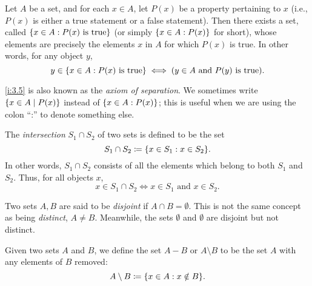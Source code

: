 \begin{ax}\label{i:3.5}
  Let \(A\) be a set, and for each \(x \in A\), let \(P(x)\) be a property pertaining to \(x\) (i.e., \(P(x)\) is either a true statement or a false statement).
  Then there exists a set, called \(\left\lbrace x \in A : P(x) \text{ is true}\right\rbrace\) (or simply \(\left\lbrace x \in A : P(x)\right\rbrace\) for short), whose elements are precisely the elements \(x\) in \(A\) for which \(P(x)\) is true.
  In other words, for any object \(y\),
  \[
    y \in \left\lbrace x \in A : P(x) \text{ is true}\right\rbrace \iff (y \in A \text{ and } P(y) \text{ is true}).
  \]
\end{ax}

\begin{note}
  \cref{i:3.5} is also known as the \emph{axiom of separation}.
  We sometimes write \(\left\lbrace x \in A \mid P(x)\right\rbrace\) instead of \(\left\lbrace x \in A : P(x)\right\rbrace\);
  this is useful when we are using the colon ``:'' to denote something else.
\end{note}

\setcounter{thm}{22}
\begin{defn}[Intersections]\label{i:3.1.23}
  The \emph{intersection} \(S_1 \cap S_2\) of two sets is defined to be the set
  \[
    S_1 \cap S_2 \coloneqq \set{x \in S_1 : x \in S_2}.
  \]
  In other words, \(S_1 \cap S_2\) consists of all the elements which belong to both \(S_1\) and \(S_2\).
  Thus, for all objects \(x\),
  \[
    x \in S_1 \cap S_2 \iff x \in S_1 \text{ and } x \in S_2.
  \]
\end{defn}

\begin{note}
  Two sets \(A, B\) are said to be \emph{disjoint} if \(A \cap B = \emptyset\).
  This is not the same concept as being \emph{distinct}, \(A \neq B\).
  Meanwhile, the sets \(\emptyset\) and \(\emptyset\) are disjoint but not distinct.
\end{note}

\setcounter{thm}{26}
\begin{defn}\label{i:3.1.27}
  Given two sets \(A\) and \(B\), we define the set \(A - B\) or \(A \setminus B\) to be the set \(A\) with any elements of \(B\) removed:
  \[
    A \setminus B \coloneqq \set{x \in A : x \notin B}.
  \]
\end{defn}

